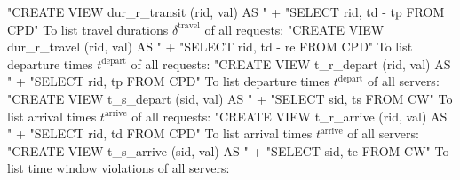 "CREATE VIEW dur_r_transit (rid, val) AS "
  + "SELECT rid, td - tp FROM CPD"
\nwendcode{}\nwdocspar
To list travel durations $\delta^\textrm{travel}$ of all requests:
\nwenddocs{}\endmoddef{}
"CREATE VIEW dur_r_travel (rid, val) AS "
  + "SELECT rid, td - re FROM CPD"
\nwendcode{}\nwdocspar
To list departure times $t^\textrm{depart}$ of all requests:
\nwenddocs{}\endmoddef{}
"CREATE VIEW t_r_depart (rid, val) AS "
  + "SELECT rid, tp FROM CPD"
\nwendcode{}\nwdocspar
To list departure times $t^\textrm{depart}$ of all servers:
\nwenddocs{}\endmoddef{}
"CREATE VIEW t_s_depart (sid, val) AS "
  + "SELECT sid, ts FROM CW"
\nwendcode{}\nwdocspar
To list arrival times $t^\textrm{arrive}$ of all requests:
\nwenddocs{}\endmoddef{}
"CREATE VIEW t_r_arrive (rid, val) AS "
  + "SELECT rid, td FROM CPD"
\nwendcode{}\nwdocspar
To list arrival times $t^\textrm{arrive}$ of all servers:
\nwenddocs{}\endmoddef{}
"CREATE VIEW t_s_arrive (sid, val) AS "
  + "SELECT sid, te FROM CW"
\nwendcode{}\nwdocspar
To list time window violations of all servers:
\nwenddocs{}\endmoddef{}
